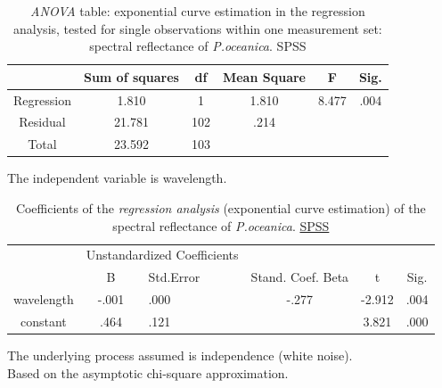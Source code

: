\documentclass[11pt]{article}
\begin{document}
\begin{appendices}
\begin{table}[H]\footnotesize
	\caption{\textit{ANOVA} table: exponential curve estimation in the regression analysis, tested for single observations within one measurement set: spectral reflectance of \textit{P.oceanica}. \ac{SPSS}}
	\begin{center}
		\begin{tabular}{|c|c|c|c| c|c|}
			\hline\hline
			& \textbf{Sum of squares} & \textbf{df} & \textbf{Mean Square} & F & Sig.\\ \hline\hline
			Regression & 1.810 & 1 & 1.810 & 8.477 & .004\\ \hline
			Residual & 21.781 & 102 & .214 & & \\ \hline
			Total & 23.592 & 103 & & & \\ \hline
		\end{tabular}
	\end{center}
	The independent variable is wavelength. 
	\label{tab:6}
\end{table}

\begin{table}[H]\footnotesize
	\caption{Coefficients of the \textit{regression analysis} (exponential curve estimation) of the spectral reflectance of \textit{P.oceanica}. \href{http://www.spss.com/}{SPSS}}
	\begin{center}
		\begin{tabular}{| c | c | p{2cm}| c | c | c |}
			\hline\hline
			& \multicolumn{2}{|c|}{Unstandardized Coefficients}\\
			\cline{2-3}
			& B & Std.Error & Stand. Coef. Beta & t & Sig.\\ \hline\hline
			wavelength & -.001 & .000 & -.277 & -2.912 & .004 \\ \hline
			constant & .464 & .121 & & 3.821 & .000 \\ \hline
		\end{tabular}
	\end{center}
	The underlying process assumed is independence (white noise).\\
	 Based on the asymptotic chi-square approximation.
	\label{tab:7}
\end{table}


\end{appendices}
\end{document}
